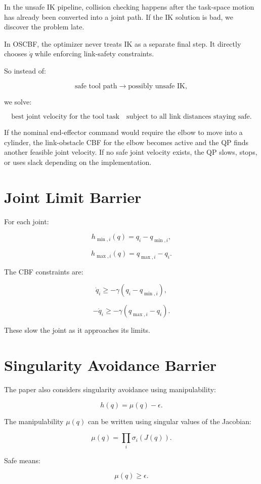 \documentclass[11pt]{article}
\begin{document}
In the unsafe IK pipeline, collision checking happens after the task-space
motion has already been converted into a joint path. If the IK solution is bad,
we discover the problem late.

In OSCBF, the optimizer never treats IK as a separate final step. It directly
chooses $\dot{q}$ while enforcing link-safety constraints.

So instead of:

\[
\text{safe tool path} \rightarrow \text{possibly unsafe IK},
\]

we solve:

\[
\text{best joint velocity for the tool task}
\quad
\text{subject to all link distances staying safe}.
\]

If the nominal end-effector command would require the elbow to move into a
cylinder, the link-obstacle CBF for the elbow becomes active and the QP finds
another feasible joint velocity. If no safe joint velocity exists, the QP
slows, stops, or uses slack depending on the implementation.

\section{Joint Limit Barrier}

For each joint:

\[
h_{\min,i}(q) = q_i - q_{\min,i},
\]

\[
h_{\max,i}(q) = q_{\max,i} - q_i.
\]

The CBF constraints are:

\[
\dot{q}_i \ge -\gamma(q_i - q_{\min,i}),
\]

\[
-\dot{q}_i \ge -\gamma(q_{\max,i} - q_i).
\]

These slow the joint as it approaches its limits.

\section{Singularity Avoidance Barrier}

The paper also considers singularity avoidance using manipulability:

\[
h(q) = \mu(q) - \epsilon.
\]

The manipulability $\mu(q)$ can be written using singular values of the
Jacobian:

\[
\mu(q) = \prod_i \sigma_i(J(q)).
\]

Safe means:

\[
\mu(q) \ge \epsilon.
\]
\end{document}
